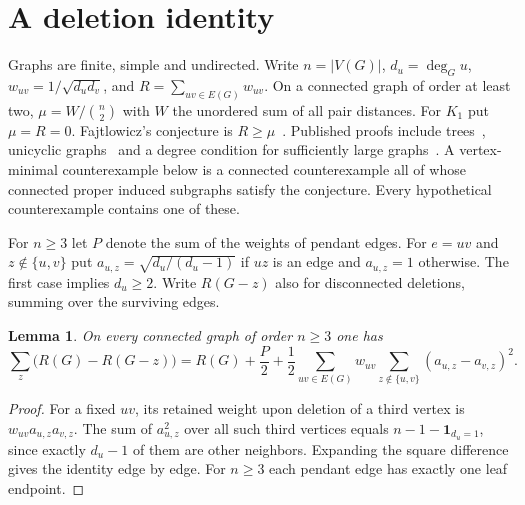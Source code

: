 \documentclass[11pt,a4paper]{article}
\newtheorem{lemma}[theorem]{Lemma}\newtheorem{corollary}[theorem]{Corollary}
\begin{document}
\section{A deletion identity}
Graphs are finite, simple and undirected. Write $n=|V(G)|$, $d_u=\deg_G u$,
$w_{uv}=1/\sqrt{d_ud_v}$, and $R=\sum_{uv\in E(G)}w_{uv}$. On a connected
graph of order at least two, $\mu=W/\binom n2$ with $W$ the unordered
sum of all pair distances. For $K_1$ put $\mu=R=0$.
Fajtlowicz's conjecture is $R\ge\mu$~\cite{p10-Fajt}. Published proofs
include trees~\cite{p10-Trees}, unicyclic graphs~\cite{p10-Uni} and a degree
condition for sufficiently large graphs~\cite{p10-Dalfo}.
A vertex-minimal counterexample below is a connected counterexample all of
whose connected proper induced subgraphs satisfy the conjecture.
Every hypothetical counterexample contains one of these.

For $n\ge3$ let $P$ denote the sum of the weights of pendant edges.
For $e=uv$ and $z\notin\{u,v\}$ put
$a_{u,z}=\sqrt{d_u/(d_u-1)}$ if $uz$ is an edge and $a_{u,z}=1$ otherwise.
The first case implies $d_u\ge2$. Write $R(G-z)$ also for disconnected
deletions, summing over the surviving edges.
\begin{lemma}\label{p10-del}
On every connected graph of order $n\ge3$ one has
\[
 \sum_z\bigl(R(G)-R(G-z)\bigr)
 =R(G)+\frac P2+
 \frac12\sum_{uv\in E(G)}w_{uv}
       \sum_{z\notin\{u,v\}}(a_{u,z}-a_{v,z})^2 .
\]
\end{lemma}
\begin{proof}
For a fixed $uv$, its retained weight upon deletion of a third vertex is
$w_{uv}a_{u,z}a_{v,z}$. The sum of $a_{u,z}^2$ over all such third
vertices equals $n-1-\mathbf1_{d_u=1}$, since exactly $d_u-1$ of them
are other neighbors. Expanding the square difference gives the identity
edge by edge. For $n\ge3$ each pendant edge has exactly one leaf endpoint.
\end{proof}
\end{document}
